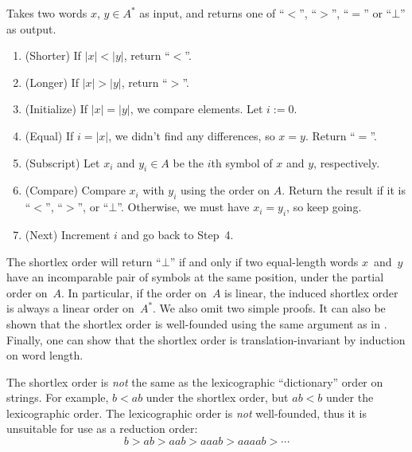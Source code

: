 \documentclass[../generics]{subfiles}
\begin{document}
\begin{algorithm}\label{shortlex}
Takes two words $x$, $y\in A^*$ as input, and returns one of ``$<$'', ``$>$'', ``$=$'' or \index{$\bot$}``$\bot$'' as output.
\begin{enumerate}
\item (Shorter) If $|x|<|y|$, return ``$<$''.
\item (Longer) If $|x|>|y|$, return ``$>$''.
\item (Initialize) If $|x|=|y|$, we compare elements. Let $i:=0$.
\item (Equal) If $i=|x|$, we didn't find any differences, so $x=y$. Return ``$=$''.
\item (Subscript) Let $x_i$ and $y_i\in A$ be the $i$th symbol of $x$ and $y$, respectively.
\item (Compare) Compare $x_i$ with $y_i$ using the order on $A$. Return the result if it is ``$<$'', ``$>$'', or ``$\bot$''. Otherwise, we must have $x_i=y_i$, so keep going.
\item (Next) Increment $i$ and go back to Step~4.
\end{enumerate}
\end{algorithm}
The shortlex order will return ``$\bot$'' if and only if two equal-length words $x$~and~$y$ have an incomparable pair of symbols at the same position, under the partial order on~$A$. In particular, if the order on~$A$ is linear, the induced shortlex order is always a linear order on~$A^*$. We also omit two simple proofs. It can also be shown that the shortlex order is well-founded using the same argument as in . Finally, one can show that the shortlex order is translation-invariant by induction on word length.

\begin{example}
The shortlex order is \emph{not} the same as the lexicographic ``dictionary'' order on strings. For example, $b<ab$ under the shortlex order, but $ab<b$ under the lexicographic order. The lexicographic order is \emph{not} well-founded, thus it is unsuitable for use as a reduction order:
\[b>ab>aab>aaab>aaaab>\cdots\]
\end{example}
\end{document}
